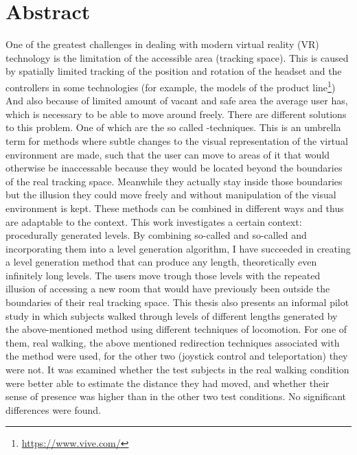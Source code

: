 \chapter*{Abstract}
One of the greatest challenges in dealing with modern virtual reality (VR) technology is the limitation of the accessible area (tracking space).
This is caused by spatially limited tracking of the position and rotation of the headset and the controllers in some technologies (for example, the models of the  product line\footnote{\href{https://www.vive.com/}{https://www.vive.com/}})
And also because of limited amount of vacant and safe area the average user has, which is necessary to be able to move around freely.
There are different solutions to this problem.
One of which are the so called -techniques.
This is an umbrella term for methods where subtle changes to the visual representation of the virtual environment are made, such that the user can move to areas of it that would otherwise be inaccessable because they would be located beyond the boundaries of the real tracking space. Meanwhile they actually stay inside those boundaries but the illusion they could move freely and without manipulation of the visual environment is kept.
These methods can be combined in different ways and thus are adaptable to the context. This work investigates a certain context: procedurally generated levels. By combining so-called  and so-called  and incorporating them into a level generation algorithm, I have succeeded in creating a level generation method that can produce any length, theoretically even infinitely long levels.
The users move trough those levels with the repeated illusion of accessing a new room that would have previously been outside the boundaries of their real tracking space.
This thesis also presents an informal pilot study in which subjects walked through levels of different lengths generated by the above-mentioned method using different techniques of locomotion. For one of them, real walking, the above mentioned redirection techniques associated with the method were used, for the other two (joystick control and teleportation) they were not. It was examined whether the test subjects in the real walking condition were better able to estimate the distance they had moved, and whether their sense of presence was higher than in the other two test conditions. No significant differences were found.